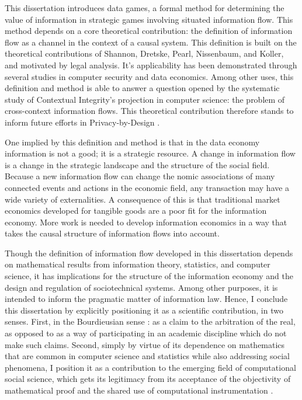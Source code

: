 \documentclass[../thesis.tex]{subfiles}
\begin{document}
 This dissertation introduces data games,
 a formal method for determining
 the value of information in strategic games involving
 situated information flow.
 This method depends on a core theoretical contribution:
 the definition of information flow as a channel in the context
 of a causal system.
 This definition is built on the theoretical contributions
 of Shannon, Dretske, Pearl, Nissenbaum, and Koller,
 and motivated by legal analysis.
 It's applicability has been demonstrated through several
 studies in computer security and data economics.
 Among other uses, this definition and method is able
 to answer a question opened by the systematic study
 of Contextual Integrity's projection in computer science:
 the problem of cross-context information flows.
 This theoretical contribution therefore stands to inform
 future efforts in Privacy-by-Design \cite{gurses2011engineering}.

 One implied by this definition and method is that in the
 data economy information is not a good; it is a strategic resource.
 A change in information flow is a change in the strategic landscape
 and the structure of the social field.
 Because a new information flow can change the nomic associations
 of many connected events and actions in the economic field,
 any transaction may have a wide variety of externalities.
 A consequence of this is that traditional market economics
 developed for tangible goods are a poor fit for the information
 economy.
 More work is needed to develop information economics in a way
 that takes the causal structure of information flows into
 account.
 
 Though the definition of information flow developed in
 this dissertation depends on mathematical results
 from information theory, statistics, and computer science,
 it has implications for the structure of the information
 economy and the design and regulation of sociotechnical systems.
 Among other purposes, it is intended to inform the pragmatic
 matter of information law.
 Hence, I conclude this dissertation by explicitly positioning it
 as a scientific contribution, in two senses.
 First, in the Bourdieusian sense 
 \citep{bourdieu2004science}: as a claim to the arbitration of
 the real, as opposed to as a way of participating in
 an academic discipline which do not make such claims.
 Second, simply by virtue of its dependence on
 mathematics that are common in computer science
 and statistics while also addressing social phenomena,
 I position it as a contribution
 to the emerging field of
 computational social science, which gets its legitimacy
 from its acceptance of the objectivity of mathematical
 proof and the shared use of computational instrumentation
 \citep{benthall2016philosophy}.
\end{document}
